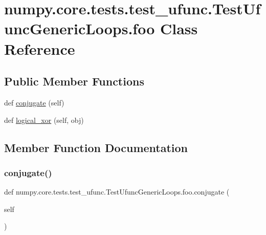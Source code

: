\hypertarget{classnumpy_1_1core_1_1tests_1_1test__ufunc_1_1TestUfuncGenericLoops_1_1foo}{}\section{numpy.\+core.\+tests.\+test\+\_\+ufunc.\+Test\+Ufunc\+Generic\+Loops.\+foo Class Reference}
\label{classnumpy_1_1core_1_1tests_1_1test__ufunc_1_1TestUfuncGenericLoops_1_1foo}
\subsection*{Public Member Functions}
\begin{DoxyCompactItemize}
\item 
def \hyperlink{classnumpy_1_1core_1_1tests_1_1test__ufunc_1_1TestUfuncGenericLoops_1_1foo_ae0fd39f18ad582d7c4611ad59b72b948}{conjugate} (self)
\item 
def \hyperlink{classnumpy_1_1core_1_1tests_1_1test__ufunc_1_1TestUfuncGenericLoops_1_1foo_a8641e4d529d50d6160da76f066bdfcfb}{logical\+\_\+xor} (self, obj)
\end{DoxyCompactItemize}


\subsection{Member Function Documentation}
\mbox{\label{classnumpy_1_1core_1_1tests_1_1test__ufunc_1_1TestUfuncGenericLoops_1_1foo_ae0fd39f18ad582d7c4611ad59b72b948}} 
\subsubsection{\texorpdfstring{conjugate()}{conjugate()}}
{\footnotesize\ttfamily def numpy.\+core.\+tests.\+test\+\_\+ufunc.\+Test\+Ufunc\+Generic\+Loops.\+foo.\+conjugate (\begin{DoxyParamCaption}\item[{}]{self }\end{DoxyParamCaption})}

